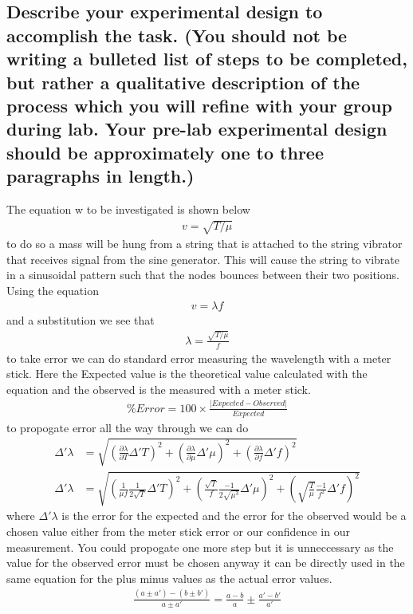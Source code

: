 \documentclass{article}
\begin{document}
\subsection*{Describe your experimental design to accomplish the task. (You should not be writing a bulleted list of steps to be completed, but rather a qualitative description of the process which you will refine with your group during lab. Your pre-lab experimental design should be approximately one to three paragraphs in length.)}

    The equation w to be investigated is shown below
    \begin{align*}
        v = \sqrt{T/\mu}
    \end{align*}
    to do so a mass will be hung from a string that is attached to the string vibrator that receives signal from the sine generator. This will cause the string to vibrate in a sinusoidal pattern such that the nodes bounces between their two positions. Using the equation 
    \begin{align*}
        v = \lambda f
    \end{align*}
    and a substitution we see that 
    \begin{align*}
        \lambda = \frac{\sqrt{T/\mu}}{f}
    \end{align*}
    to take error we can do standard error measuring the wavelength with a meter stick. Here the Expected value is the theoretical value calculated with the equation and the observed is the measured with a meter stick.
    \begin{align*}
        \%Error = 100 \times\frac{|Expected -Observed|}{Expected}
    \end{align*}
    to propogate error all the way through we can do
    \begin{align*}
        \Delta'\lambda &= \sqrt{(\frac{\partial\lambda}{\partial T}\Delta' T)^2 + (\frac{\partial\lambda}{\partial \mu}\Delta' \mu)^2 + (\frac{\partial\lambda}{\partial f}\Delta' f)^2}\\
        \Delta'\lambda &= \sqrt{
        (\frac{1}{\mu f}\frac{1}{2\sqrt{T}}\Delta' T)^2 + (\frac{\sqrt{T}}{f}\frac{-1}{2\sqrt{\mu^3}}\Delta' \mu)^2 + (\sqrt{\frac{T}{\mu}}
        \frac{-1}{f^2}\Delta'f)^2 
        }
    \end{align*}
    where $\Delta'\lambda$ is the error for the expected and the error for the observed would be a chosen value either from the meter stick error or our confidence in our measurement. You could propogate one more step but it is unneccessary as the value for the observed error must be chosen anyway it can be directly used in the same equation for the plus minus values as the actual error values. 
    \begin{align*}
        \frac{(a \pm a') - (b \pm b')}{a\pm a'} = \frac{a-b}{a} \pm \frac{a'-b'}{a'}
    \end{align*}
\end{document}

